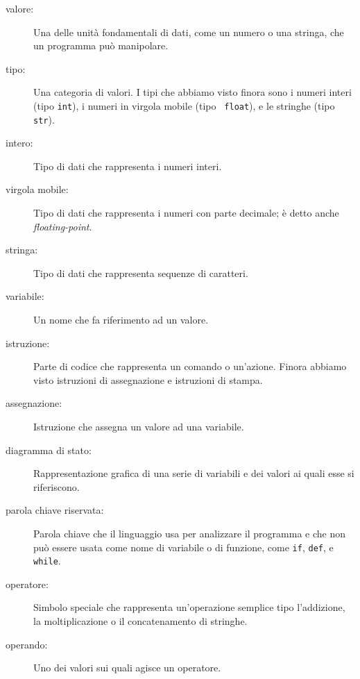 \documentclass[10pt]{book}
\begin{document}
\begin{description}

\item[valore:]  Una delle unità fondamentali di dati, come un numero o una stringa, che un programma può manipolare.

\item[tipo:] Una categoria di valori. I tipi che abbiamo visto finora sono i numeri interi (tipo {\tt int}), i numeri in virgola mobile (tipo {\tt
float}), e le stringhe (tipo {\tt str}).

\item[intero:] Tipo di dati che rappresenta i numeri interi.

\item[virgola mobile:] Tipo di dati che rappresenta i numeri con parte decimale; è detto anche {\em floating-point}.

\item[stringa:] Tipo di dati che rappresenta sequenze di caratteri.

\item[variabile:]  Un nome che fa riferimento ad un valore.

\item[istruzione:]  Parte di codice che rappresenta un comando o un'azione.    Finora abbiamo visto istruzioni di assegnazione e istruzioni di stampa.

\item[assegnazione:]  Istruzione che assegna un valore ad una variabile.

\item[diagramma di stato:]  Rappresentazione grafica di una serie di variabili e dei valori ai quali esse si riferiscono.

\item[parola chiave riservata:]  Parola chiave che il linguaggio usa per analizzare il programma e che non può essere usata come nome di variabile o di funzione, come {\tt if}, {\tt  def}, e {\tt while}.

\item[operatore:]  Simbolo speciale che rappresenta un'operazione semplice tipo
          l'addizione, la moltiplicazione o il concatenamento di stringhe.

\item[operando:]  Uno dei valori sui quali agisce un operatore.


\end{description}
\end{document}
